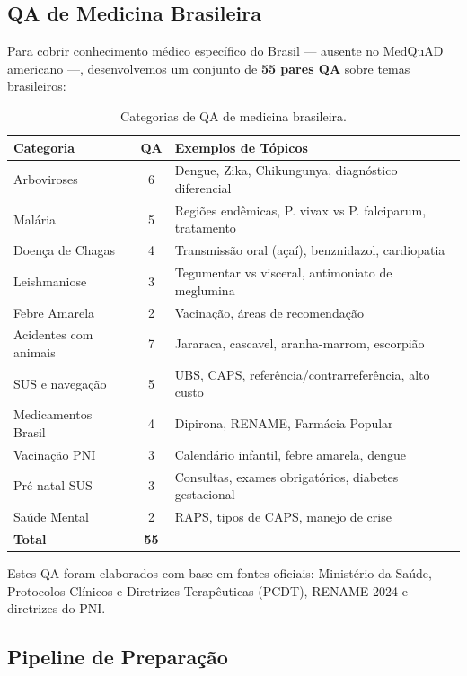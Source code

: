 \subsection{QA de Medicina Brasileira}

Para cobrir conhecimento médico específico do Brasil --- ausente no MedQuAD americano ---, desenvolvemos um conjunto de \textbf{55 pares QA} sobre temas brasileiros:

\begin{table}[H]
\centering
\caption{Categorias de QA de medicina brasileira.}
\label{tab:qa-brasileiro}
\begin{tabularx}{\textwidth}{l c X}
\toprule
\textbf{Categoria} & \textbf{QA} & \textbf{Exemplos de Tópicos} \\
\midrule
Arboviroses & 6 & Dengue, Zika, Chikungunya, diagnóstico diferencial \\
Malária & 5 & Regiões endêmicas, P. vivax vs P. falciparum, tratamento \\
Doença de Chagas & 4 & Transmissão oral (açaí), benznidazol, cardiopatia \\
Leishmaniose & 3 & Tegumentar vs visceral, antimoniato de meglumina \\
Febre Amarela & 2 & Vacinação, áreas de recomendação \\
Acidentes com animais & 7 & Jararaca, cascavel, aranha-marrom, escorpião \\
SUS e navegação & 5 & UBS, CAPS, referência/contrarreferência, alto custo \\
Medicamentos Brasil & 4 & Dipirona, RENAME, Farmácia Popular \\
Vacinação PNI & 3 & Calendário infantil, febre amarela, dengue \\
Pré-natal SUS & 3 & Consultas, exames obrigatórios, diabetes gestacional \\
Saúde Mental & 2 & RAPS, tipos de CAPS, manejo de crise \\
\midrule
\textbf{Total} & \textbf{55} & \\
\bottomrule
\end{tabularx}
\end{table}

Estes QA foram elaborados com base em fontes oficiais: Ministério da Saúde, Protocolos Clínicos e Diretrizes Terapêuticas (PCDT), RENAME 2024 e diretrizes do PNI.

\subsection{Pipeline de Preparação}

